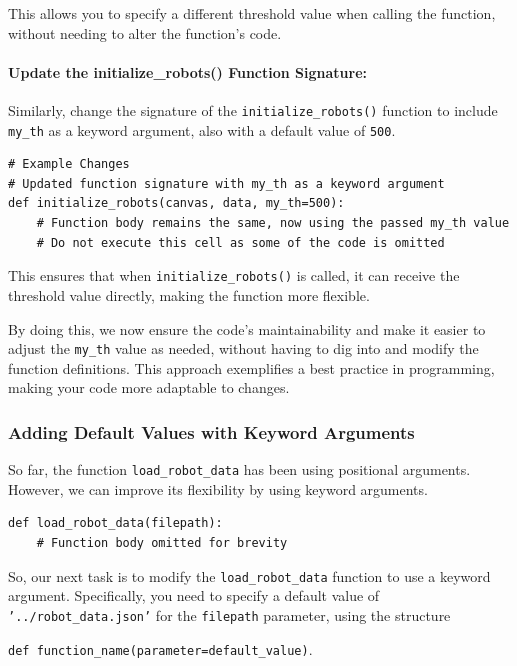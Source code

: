 This allows you to specify a different threshold value when calling the function, without needing to alter the function's code.

\paragraph*{Update the initialize\_robots() Function Signature:}
Similarly, change the signature of the \texttt{initialize\_robots()} function to include \texttt{my\_th} as a keyword argument, also with a default value of \texttt{500}.

\begin{verbatim}
# Example Changes
# Updated function signature with my_th as a keyword argument
def initialize_robots(canvas, data, my_th=500):
    # Function body remains the same, now using the passed my_th value
    # Do not execute this cell as some of the code is omitted
\end{verbatim}

This ensures that when \texttt{initialize\_robots()} is called, it can receive the threshold value directly, making the function more flexible.

By doing this, we now ensure the code's maintainability and make it easier to adjust the \texttt{my\_th} value as needed, without having to dig into and modify the function definitions. This approach exemplifies a best practice in programming, making your code more adaptable to changes.


\newpage
\subsubsection{Adding Default Values with Keyword Arguments}

So far, the function \texttt{load\_robot\_data} has been using positional arguments. However, we can improve its flexibility by using keyword arguments.

\begin{verbatim}
def load_robot_data(filepath):
    # Function body omitted for brevity
\end{verbatim}

So, our next task is to modify the \texttt{load\_robot\_data} function to use a keyword argument. Specifically, you need to specify a default value of \texttt{'../robot\_data.json'} for the \texttt{filepath} parameter, using the structure

\begin{center}
    \texttt{def function\_name(parameter=default\_value)}.
\end{center}


